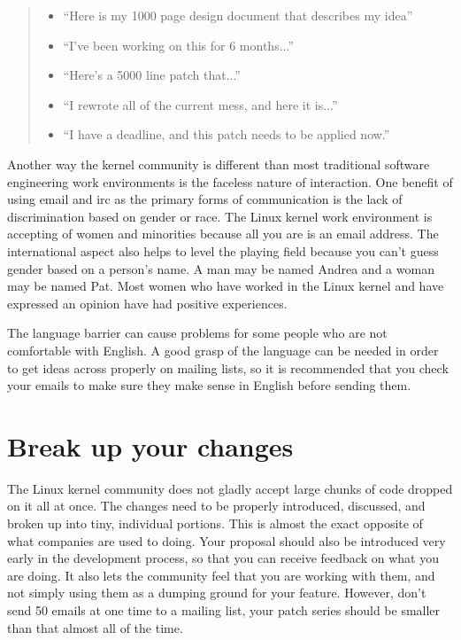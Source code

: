 \documentclass[a4paper,8pt,english]{sphinxmanual}
\begin{document}
\begin{quote}
\begin{itemize}
\item {} 
``Here is my 1000 page design document that describes my idea''

\item {} 
``I've been working on this for 6 months...''

\item {} 
``Here's a 5000 line patch that...''

\item {} 
``I rewrote all of the current mess, and here it is...''

\item {} 
``I have a deadline, and this patch needs to be applied now.''

\end{itemize}
\end{quote}

Another way the kernel community is different than most traditional
software engineering work environments is the faceless nature of
interaction.  One benefit of using email and irc as the primary forms of
communication is the lack of discrimination based on gender or race.
The Linux kernel work environment is accepting of women and minorities
because all you are is an email address.  The international aspect also
helps to level the playing field because you can't guess gender based on
a person's name. A man may be named Andrea and a woman may be named Pat.
Most women who have worked in the Linux kernel and have expressed an
opinion have had positive experiences.

The language barrier can cause problems for some people who are not
comfortable with English.  A good grasp of the language can be needed in
order to get ideas across properly on mailing lists, so it is
recommended that you check your emails to make sure they make sense in
English before sending them.


\section{Break up your changes}
\label{process/howto:break-up-your-changes}
The Linux kernel community does not gladly accept large chunks of code
dropped on it all at once.  The changes need to be properly introduced,
discussed, and broken up into tiny, individual portions.  This is almost
the exact opposite of what companies are used to doing.  Your proposal
should also be introduced very early in the development process, so that
you can receive feedback on what you are doing.  It also lets the
community feel that you are working with them, and not simply using them
as a dumping ground for your feature.  However, don't send 50 emails at
one time to a mailing list, your patch series should be smaller than
that almost all of the time.
\end{document}
